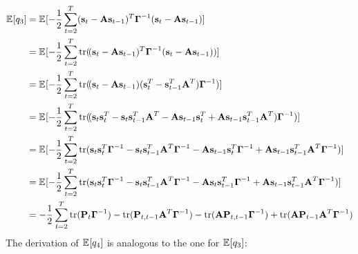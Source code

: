 		\begin{align*}
			\E{q_3}
				&= \E{-\frac{1}{2} \sum_{t = 2}^{T} \paren{\vec{s}_t - \mat{A}\vec{s}_{t - 1}}^T \mat{\Gamma}^{-1} \paren{\vec{s}_t - \mat{A}\vec{s}_{t - 1}}} \\
				&= \E{-\frac{1}{2} \sum_{t = 2}^{T} \tr\paren{\!\paren{\vec{s}_t - \mat{A}\vec{s}_{t - 1}}^T \mat{\Gamma}^{-1} \paren{\vec{s}_t - \mat{A}\vec{s}_{t - 1}}}} \\
				&= \E{-\frac{1}{2} \sum_{t = 2}^{T} \tr\paren{\!\paren{\vec{s}_t - \mat{A}\vec{s}_{t - 1}} \paren{\vec{s}_t^T - \vec{s}_{t - 1}^T \mat{A}^T} \mat{\Gamma}^{-1}}} \\
				&= \E{-\frac{1}{2} \sum_{t = 2}^{T} \tr\paren{\!\paren{\vec{s}_t \vec{s}_t^T - \vec{s}_t \vec{s}_{t - 1}^T \mat{A}^T - \mat{A}\vec{s}_{t - 1} \vec{s}_t^T + \mat{A}\vec{s}_{t - 1} \vec{s}_{t - 1}^T \mat{A}^T} \mat{\Gamma}^{-1}}} \\
				&= \E{-\frac{1}{2} \sum_{t = 2}^{T} \tr\paren{\vec{s}_t \vec{s}_t^T \mat{\Gamma}^{-1} - \vec{s}_t \vec{s}_{t - 1}^T \mat{A}^T \mat{\Gamma}^{-1} - \mat{A}\vec{s}_{t - 1} \vec{s}_t^T \mat{\Gamma}^{-1} + \mat{A}\vec{s}_{t - 1} \vec{s}_{t - 1}^T \mat{A}^T \mat{\Gamma}^{-1}}} \\
				&= \E{-\frac{1}{2} \sum_{t = 2}^{T} \tr\paren{\vec{s}_t \vec{s}_t^T \mat{\Gamma}^{-1} - \vec{s}_t \vec{s}_{t - 1}^T \mat{A}^T \mat{\Gamma}^{-1} - \mat{A} \vec{s}_t \vec{s}_{t - 1}^T \mat{\Gamma}^{-1} + \mat{A}\vec{s}_{t - 1} \vec{s}_{t - 1}^T \mat{A}^T \mat{\Gamma}^{-1}}} \\
				&= -\frac{1}{2} \sum_{t = 2}^{T} \tr\paren{\mat{P}_t \mat{\Gamma}^{-1}} - \tr\paren{\mat{P}_{t, t - 1} \mat{A}^T \mat{\Gamma}^{-1}} - \tr\paren{\mat{A} \mat{P}_{t, t - 1} \mat{\Gamma}^{-1}} + \tr\paren{\mat{A} \mat{P}_{t - 1} \mat{A}^T \mat{\Gamma}^{-1}}
		\end{align*}
		The derivation of \( \mathbb{E}_{}[q_4] \) is analogous to the one for \( \mathbb{E}_{}[q_3] \):
